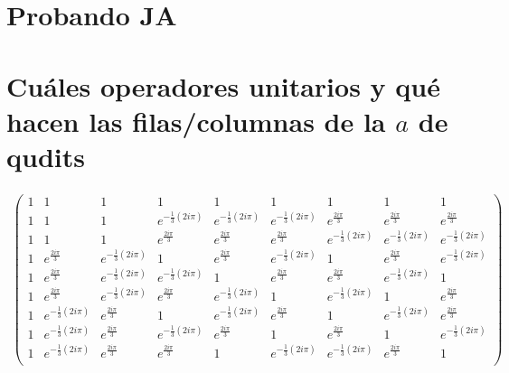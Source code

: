 \section{Probando JA}

\section{Cuáles operadores unitarios y qué hacen las filas/columnas de la $a$ de qudits}

\begin{align*}\label{eq:a:qutrits}
\left(
\begin{array}{ccccccccc}
 1 & 1 & 1 & 1 & 1 & 1 & 1 & 1 & 1 \\
 1 & 1 & 1 & e^{-\frac{1}{3} (2 i \pi )} & e^{-\frac{1}{3} (2 i \pi )} & e^{-\frac{1}{3} (2 i \pi )} & e^{\frac{2 i \pi }{3}} & e^{\frac{2 i \pi }{3}} & e^{\frac{2 i \pi }{3}} \\
 1 & 1 & 1 & e^{\frac{2 i \pi }{3}} & e^{\frac{2 i \pi }{3}} & e^{\frac{2 i \pi }{3}} & e^{-\frac{1}{3} (2 i \pi )} & e^{-\frac{1}{3} (2 i \pi )} & e^{-\frac{1}{3} (2 i \pi )} \\
 1 & e^{\frac{2 i \pi }{3}} & e^{-\frac{1}{3} (2 i \pi )} & 1 & e^{\frac{2 i \pi }{3}} & e^{-\frac{1}{3} (2 i \pi )} & 1 & e^{\frac{2 i \pi }{3}} & e^{-\frac{1}{3} (2 i \pi )} \\
 1 & e^{\frac{2 i \pi }{3}} & e^{-\frac{1}{3} (2 i \pi )} & e^{-\frac{1}{3} (2 i \pi )} & 1 & e^{\frac{2 i \pi }{3}} & e^{\frac{2 i \pi }{3}} & e^{-\frac{1}{3} (2 i \pi )} & 1 \\
 1 & e^{\frac{2 i \pi }{3}} & e^{-\frac{1}{3} (2 i \pi )} & e^{\frac{2 i \pi }{3}} & e^{-\frac{1}{3} (2 i \pi )} & 1 & e^{-\frac{1}{3} (2 i \pi )} & 1 & e^{\frac{2 i \pi }{3}} \\
 1 & e^{-\frac{1}{3} (2 i \pi )} & e^{\frac{2 i \pi }{3}} & 1 & e^{-\frac{1}{3} (2 i \pi )} & e^{\frac{2 i \pi }{3}} & 1 & e^{-\frac{1}{3} (2 i \pi )} & e^{\frac{2 i \pi }{3}} \\
 1 & e^{-\frac{1}{3} (2 i \pi )} & e^{\frac{2 i \pi }{3}} & e^{-\frac{1}{3} (2 i \pi )} & e^{\frac{2 i \pi }{3}} & 1 & e^{\frac{2 i \pi }{3}} & 1 & e^{-\frac{1}{3} (2 i \pi )} \\
 1 & e^{-\frac{1}{3} (2 i \pi )} & e^{\frac{2 i \pi }{3}} & e^{\frac{2 i \pi }{3}} & 1 & e^{-\frac{1}{3} (2 i \pi )} & e^{-\frac{1}{3} (2 i \pi )} & e^{\frac{2 i \pi }{3}} & 1 \\
\end{array}
\right)
\end{align*}

